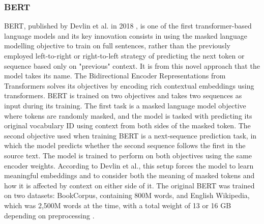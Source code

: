 \documentclass[12pt]{report}
\begin{document}
\subsubsection*{BERT}
BERT, published by Devlin et al. in 2018 \cite{BERT}, is one of the first transformer-based language models and its key innovation consists in using the masked language modelling objective to train on full sentences, rather than the previously employed left-to-right or right-to-left strategy of predicting the next token or sequence based only on "previous" context.
It is from this novel approach that the model takes its name. The Bidirectional Encoder Representations from Transformers solves its objectives by encoding rich contextual embeddings using transformers.
BERT is trained on two objectives and takes two sequences as input during its training.
The first task is a masked language model objective where tokens are randomly masked, and the model is tasked with predicting its original vocabulary ID using context from both sides of the masked token.
The second objective used when training BERT is a next-sequence prediction task, in which the model predicts whether the second sequence follows the first in the source text.
The model is trained to perform on both objectives using the same encoder weights.
According to Devlin et al., this setup forces the model to learn meaningful embeddings and to consider both the meaning of masked tokens and how it is affected by context on either side of it.
The original BERT was trained on two datasets: BookCorpus, containing 800M words, and English Wikipedia, which was 2,500M words at the time, with a total weight of 13 or 16 GB depending on preprocessing \cite{BERT, roberta}.
\end{document}
